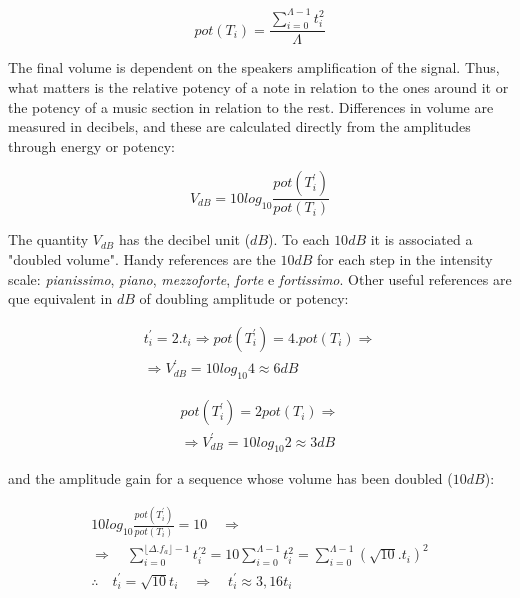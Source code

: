 \documentclass[
 aip,
 jmp,
 amsmath,amssymb,
 reprint,
]{revtex4-1}
\begin{document}
\begin{equation}\label{eq:potencia}
pot(T_i)=\frac{\sum_{i=0}^{\Lambda -1} t_i^2}{\Lambda}
\end{equation} 

The final volume is dependent on the speakers amplification of the signal. Thus, what matters is the relative potency of a note in relation to the ones around it or the potency of a music section in relation to the rest. Differences in volume are measured in decibels, and these are calculated directly from the amplitudes through energy or potency:

\begin{equation}\label{decibels}
V_{dB}=10log_{10}\frac{pot(T^{'}_i)}{pot(T_i)}
\end{equation}

The quantity $V_{dB}$ has the decibel unit ($dB$). 
To each $10dB$ it is associated a "doubled volume".
Handy references are the $10dB$ for each step in the intensity scale: \emph{pianissimo}, \emph{piano}, \emph{mezzoforte}, \emph{forte} e \emph{fortissimo}. Other useful references are que equivalent in $dB$ of doubling amplitude or potency:

\begin{equation}\label{eq:ampVol}
\begin{split}
t_i^{'}=2 . t_i \Rightarrow pot(T^{'}_i)=4 . pot(T_i) \Rightarrow \\ \Rightarrow V^{'}_{dB}=10log_{10} 4 \approx 6 dB
\end{split}
\end{equation}

\begin{equation}\label{eq:potVol}
\begin{split}
pot(T^{'}_i)=2 pot(T_i) \Rightarrow \\ \Rightarrow V^{'}_{dB}=10log_{10} 2 \approx 3 dB
\end{split}
\end{equation}

and the amplitude gain for a sequence whose volume has been doubled ($10dB$):

\begin{equation}\label{eq:dobraVol}
\begin{split}
10log_{10}\frac{pot(T^{'}_i)}{pot(T_i)} = 10 \quad \Rightarrow \\ \Rightarrow \quad \sum_{i=0}^{\lfloor \Delta.f_a \rfloor -1}t^{'2}_i=10\sum_{i=0}^{\Lambda-1}t_i^2=\sum_{i=0}^{\Lambda-1}(\sqrt{10}.t_i)^2 \\
\therefore \quad t^{'}_i=\sqrt{10}t_i \quad \Rightarrow \quad t^{'}_i \approx 3,16t_i
\end{split}
\end{equation}
\end{document}

